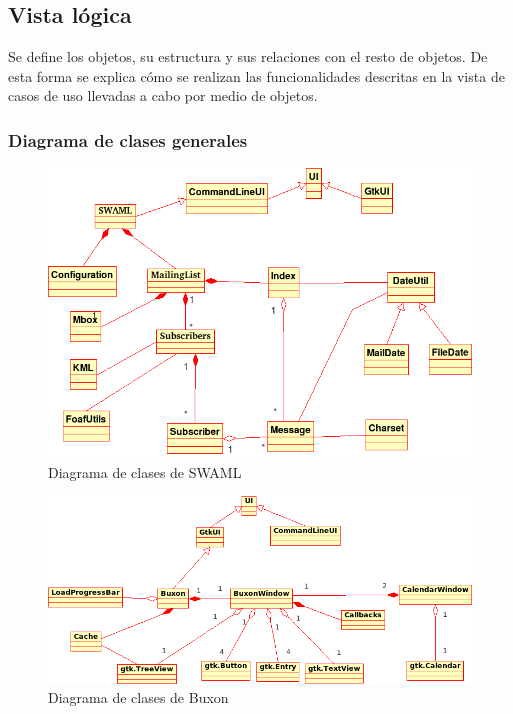 
\subsection{Vista lógica}

Se define los objetos, su estructura y sus relaciones con el resto de objetos.
De esta forma se explica cómo se realizan las funcionalidades descritas en la 
vista de casos de uso llevadas a cabo por medio de objetos. 

\subsubsection{Diagrama de clases generales}

\begin{figure}[H]
	\centering
 	\includegraphics[width=14cm]{images/uml/clases/swaml.png}
	\caption{Diagrama de clases de SWAML}
	\label{fig:uml:swaml}
\end{figure}

\begin{figure}[H]
	\centering
 	\includegraphics[width=14cm]{images/uml/clases/buxon.png}
	\caption{Diagrama de clases de Buxon}
	\label{fig:uml:buxon}
\end{figure}

